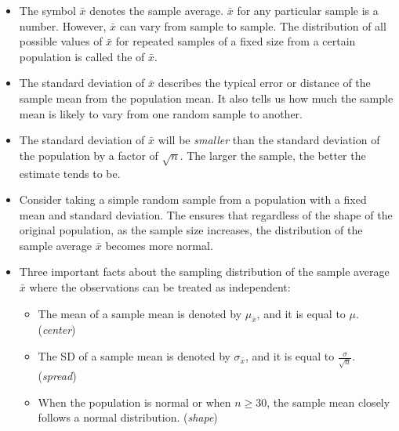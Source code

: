 \begin{itemize}
\item The symbol $\bar{x}$ denotes the sample average.  $\bar{x}$ for any particular sample is a number.  However, $\bar{x}$ can vary from sample to sample.  The distribution of all possible values of $\bar{x}$ for repeated samples of a fixed size from a certain population is called the  of $\bar{x}$.

\item The standard deviation of $\bar{x}$ describes the typical error or distance of the sample mean from the population mean.  It also tells us how much the sample mean is likely to vary from one random sample to another.  

\item The standard deviation of $\bar{x}$ will be \textit{smaller} than the standard deviation of the population by a factor of $\sqrt{n}$.  The larger the sample, the better the estimate tends to be.

\item Consider taking a simple random sample from a population with a fixed mean and standard deviation.  The  ensures that regardless of the shape of the original population, as the sample size increases, the distribution of the sample average $\bar{x}$ becomes more normal.  

\item Three important facts about the sampling distribution of the sample average $\bar{x}$ where the observations can be treated as independent:
\begin{itemize}\vspace{-1mm}
\setlength{\itemsep}{0mm}
\item The mean of a sample mean is denoted by $\mu_{\bar{x}}$, and it is equal to $\mu$. (\textit{center})
\item The SD of a sample mean is denoted by $\sigma_{\bar{x}}$, and it is equal to $\frac{\sigma}{\sqrt{n}}$.  (\textit{spread})
\item When the population is normal or when $n\ge 30$, the sample mean closely follows a normal distribution.   (\textit{shape})
\end{itemize}


\end{itemize}
